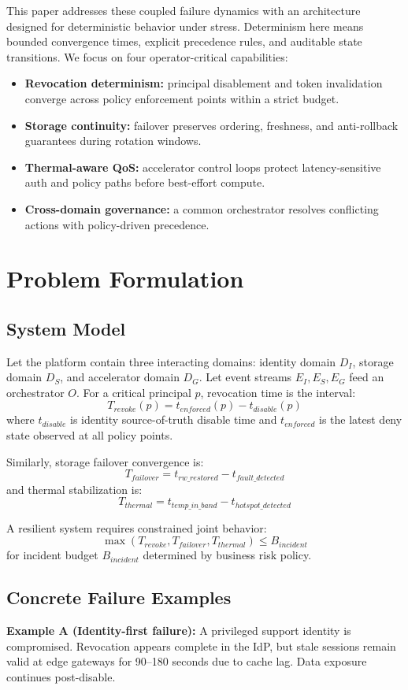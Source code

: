 \documentclass[12pt]{article}
\begin{document}
This paper addresses these coupled failure dynamics with an architecture designed for deterministic behavior under stress. Determinism here means bounded convergence times, explicit precedence rules, and auditable state transitions. We focus on four operator-critical capabilities:
\begin{itemize}
  \item \textbf{Revocation determinism:} principal disablement and token invalidation converge across policy enforcement points within a strict budget.
  \item \textbf{Storage continuity:} failover preserves ordering, freshness, and anti-rollback guarantees during rotation windows.
  \item \textbf{Thermal-aware QoS:} accelerator control loops protect latency-sensitive auth and policy paths before best-effort compute.
  \item \textbf{Cross-domain governance:} a common orchestrator resolves conflicting actions with policy-driven precedence.
\end{itemize}

\section{Problem Formulation}
\subsection{System Model}
Let the platform contain three interacting domains: identity domain $D_I$, storage domain $D_S$, and accelerator domain $D_G$. Let event streams $E_I, E_S, E_G$ feed an orchestrator $O$. For a critical principal $p$, revocation time is the interval:
\[
T_{revoke}(p) = t_{enforced}(p) - t_{disable}(p)
\]
where $t_{disable}$ is identity source-of-truth disable time and $t_{enforced}$ is the latest deny state observed at all policy points.

Similarly, storage failover convergence is:
\[
T_{failover} = t_{rw\_restored} - t_{fault\_detected}
\]
and thermal stabilization is:
\[
T_{thermal} = t_{temp\_in\_band} - t_{hotspot\_detected}
\]

A resilient system requires constrained joint behavior:
\[
\max(T_{revoke}, T_{failover}, T_{thermal}) \leq B_{incident}
\]
for incident budget $B_{incident}$ determined by business risk policy.

\subsection{Concrete Failure Examples}
\textbf{Example A (Identity-first failure):} A privileged support identity is compromised. Revocation appears complete in the IdP, but stale sessions remain valid at edge gateways for 90--180 seconds due to cache lag. Data exposure continues post-disable.
\end{document}
